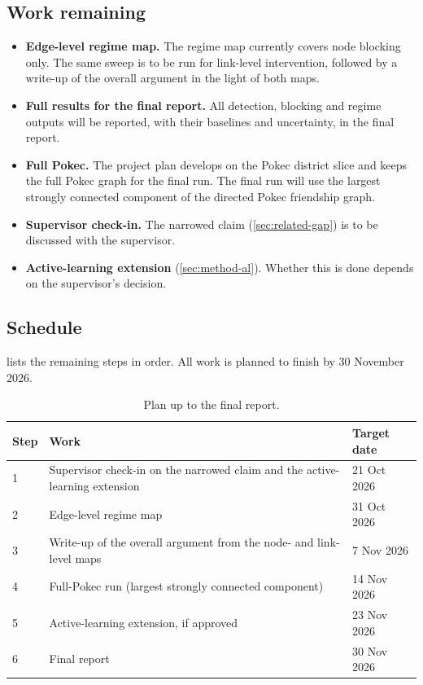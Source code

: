 \subsection{Work remaining}
\begin{itemize}
  \item \textbf{Edge-level regime map.} The regime map currently covers node blocking
        only. The same sweep is to be run for link-level intervention, followed by a
        write-up of the overall argument in the light of both maps.
  \item \textbf{Full results for the final report.} All detection, blocking and regime
        outputs will be reported, with their baselines and uncertainty, in the final
        report.
  \item \textbf{Full Pokec.} The project plan develops on the Pokec district slice and
        keeps the full Pokec graph for the final run. The final run will use the
        largest strongly connected component of the directed Pokec friendship graph.
  \item \textbf{Supervisor check-in.} The narrowed claim (\cref{sec:related-gap}) is to
        be discussed with the supervisor.
  \item \textbf{Active-learning extension} (\cref{sec:method-al}). Whether this is
        done depends on the supervisor's decision.
\end{itemize}

\subsection{Schedule}
 lists the remaining steps in order. All work is planned to finish by 30 November 2026.

\begin{table}[ht]
\centering
\caption{Plan up to the final report.}
\label{tab:schedule}
\small
\begin{tabularx}{\linewidth}{@{}l X l@{}}
\toprule
Step & Work & Target date \\
\midrule
1 & Supervisor check-in on the narrowed claim and the active-learning extension & 21 Oct 2026 \\
2 & Edge-level regime map & 31 Oct 2026 \\
3 & Write-up of the overall argument from the node- and link-level maps & 7 Nov 2026 \\
4 & Full-Pokec run (largest strongly connected component) & 14 Nov 2026 \\
5 & Active-learning extension, if approved & 23 Nov 2026 \\
6 & Final report & 30 Nov 2026 \\
\bottomrule
\end{tabularx}
\end{table}
